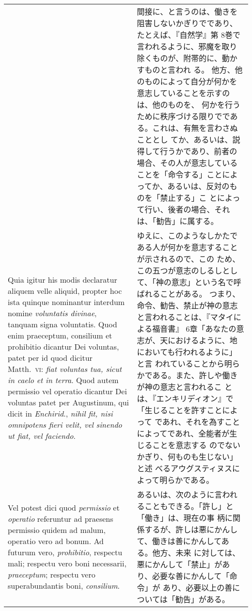 \documentclass[10pt]{jsarticle} %
\begin{document}
\begin{longtable}{p{21em}p{21em}}
&

間接に、と言うのは、働きを阻害しないかぎりでであり、たとえば、『自然学』第
 8巻で言われるように、邪魔を取り除くものが、附帯的に、動かすものと言われ
 る。
他方、他のものによって自分が何かを意志していることを示すのは、他のものを、
 何かを行うために秩序づける限りでである。これは、有無を言わさぬこととし
 てか、あるいは、説得して行うかであり、前者の場合、その人が意志している
 ことを「命令する」ことによってか、あるいは、反対のものを「禁止する」こ
 とによって行い、後者の場合、それは、「勧告」に属する。


\\


Quia igitur
his modis declaratur aliquem velle aliquid, propter hoc ista quinque
nominantur interdum nomine {\itshape voluntatis divinae}, tanquam signa
voluntatis. Quod enim praeceptum, consilium et prohibitio dicantur Dei
voluntas, patet per id quod dicitur Matth.~{\scshape vi}: {\itshape fiat voluntas tua, sicut
in caelo et in terra}. Quod autem permissio vel operatio dicantur Dei
voluntas patet per Augustinum, qui dicit in {\itshape Enchirid}., {\itshape nihil fit, nisi
omnipotens fieri velit, vel sinendo ut fiat, vel faciendo}. 


&

ゆえに、このようなしかたである人が何かを意志することが示されるので、この
 ため、この五つが意志のしるしとして、「神の意志」という名で呼ばれることがある。
つまり、命令、勧告、禁止が神の意志と言われることは、『マタイによる福音書』
 6章「あなたの意志が、天におけるように、地においても行われるように」と言
 われていることから明らかである。また、許しや働きが神の意志と言われるこ
 とは、『エンキリディオン』で「生じることを許すことによって
 であれ、それを為すことによってであれ、全能者が生じることを意志する
 のでないかぎり、何ものも生じない」と述
 べるアウグスティヌスによって明らかである。


\\


Vel potest
dici quod {\itshape permissio} et {\itshape operatio} referuntur ad praesens permissio quidem
ad malum, operatio vero ad bonum. Ad futurum vero, {\itshape prohibitio}, respectu
mali; respectu vero boni necessarii, {\itshape praeceptum}; respectu vero
superabundantis boni, {\itshape consilium}.


&

あるいは、次のように言われることもできる。「許し」と「働き」は、現在の事
 柄に関係するが、許しは悪にかんして、働きは善にかんしてある。他方、未来
 に対しては、悪にかんして「禁止」があり、必要な善にかんして「命令」が
 あり、必要以上の善については「勧告」がある。



\end{longtable}
\end{document}

